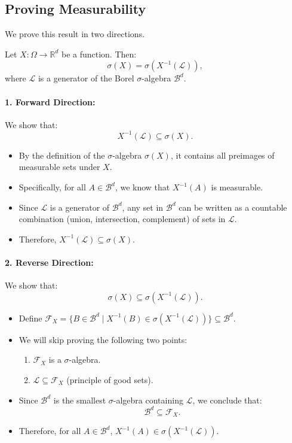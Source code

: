 \subsection{Proving Measurability}
\label{proof: measurability}

\begin{prf}
We prove this result in two directions.

Let \(X: \Omega \to \mathbb{R}^d\) be a function. Then:
\[
\sigma(X) = \sigma\left(X^{-1}(\mathcal{L})\right),
\]
where \(\mathcal{L}\) is a generator of the Borel \(\sigma\)-algebra \(\mathscr{B}^d\).

\paragraph{1. Forward Direction:}  
We show that:
\[
X^{-1}(\mathcal{L}) \subseteq \sigma(X).
\]
\begin{itemize}
    \item By the definition of the \(\sigma\)-algebra \(\sigma(X)\), it contains all preimages of measurable sets under \(X\).
    \item Specifically, for all \(A \in \mathscr{B}^d\), we know that \(X^{-1}(A)\) is measurable.
    \item Since \(\mathcal{L}\) is a generator of \(\mathscr{B}^d\), any set in \(\mathscr{B}^d\) can be written as a countable combination (union, intersection, complement) of sets in \(\mathcal{L}\).
    \item Therefore, \(X^{-1}(\mathcal{L}) \subseteq \sigma(X)\).
\end{itemize}

\paragraph{2. Reverse Direction:}  
We show that:
\[
\sigma(X) \subseteq \sigma\left(X^{-1}(\mathcal{L})\right).
\]
\begin{itemize}
    \item Define \(\mathscr{F}_X = \{ B \in \mathscr{B}^d \mid X^{-1}(B) \in \sigma(X^{-1}(\mathcal{L}))\}\subseteq \mathscr{B}^d\).
    \item We will skip proving the following two points:
    \begin{enumerate}
        \item \(\mathscr{F}_X\) is a \(\sigma\)-algebra.
        \item \(\mathcal{L} \subseteq \mathscr{F}_X\) (principle of good sets).
    \end{enumerate}
    \item Since \(\mathscr{B}^d\) is the smallest \(\sigma\)-algebra containing \(\mathcal{L}\), we conclude that:
    \[
    \mathscr{B}^d \subseteq \mathscr{F}_X.
    \]
    \item Therefore, for all \(A \in \mathscr{B}^d\), \(X^{-1}(A) \in \sigma(X^{-1}(\mathcal{L}))\).
\end{itemize}


\end{prf}
